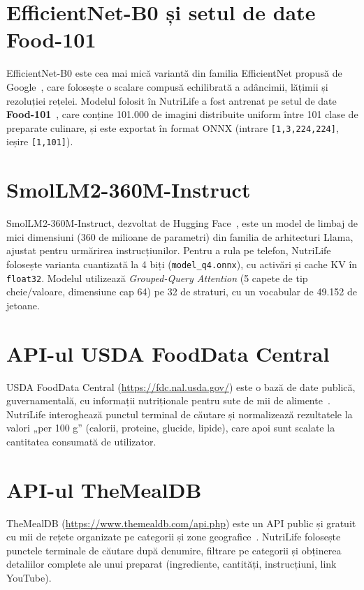 \documentclass[12pt, a4paper, twoside]{report}
\numberwithin{equation}{section}
\begin{document}
\section{EfficientNet-B0 și setul de date Food-101}

EfficientNet-B0 este cea mai mică variantă din familia EfficientNet propusă de Google~\cite{efficientnet}, care
folosește o scalare compusă echilibrată a adâncimii, lățimii și rezoluției rețelei.
Modelul folosit în NutriLife a fost antrenat pe setul de date \textbf{Food-101}~\cite{food101}, care conține
101.000 de imagini distribuite uniform între 101 clase de preparate culinare, și este
exportat în format ONNX (intrare \texttt{[1,3,224,224]}, ieșire \texttt{[1,101]}).

\section{SmolLM2-360M-Instruct}

SmolLM2-360M-Instruct, dezvoltat de Hugging Face~\cite{smollm2}, este un model de limbaj de mici dimensiuni
(360 de milioane de parametri) din familia de arhitecturi Llama, ajustat pentru urmărirea
instrucțiunilor. Pentru a rula pe telefon, NutriLife folosește varianta cuantizată la 4 biți
(\texttt{model\_q4.onnx}), cu activări și cache KV în \texttt{float32}. Modelul utilizează
\textit{Grouped-Query Attention} (5 capete de tip cheie/valoare, dimensiune cap 64) pe 32 de
straturi, cu un vocabular de 49.152 de jetoane.

\section{API-ul USDA FoodData Central}

USDA FoodData Central (\url{https://fdc.nal.usda.gov/}) este o bază de date publică,
guvernamentală, cu informații nutriționale pentru sute de mii de alimente~\cite{usda}. NutriLife
interoghează punctul terminal de căutare și normalizează rezultatele la valori „per 100 g''
(calorii, proteine, glucide, lipide), care apoi sunt scalate la cantitatea consumată de
utilizator.

\section{API-ul TheMealDB}

TheMealDB (\url{https://www.themealdb.com/api.php}) este un API public și gratuit cu mii de
rețete organizate pe categorii și zone geografice~\cite{themealdb}. NutriLife folosește punctele terminale de
căutare după denumire, filtrare pe categorii și obținerea detaliilor complete ale unui
preparat (ingrediente, cantități, instrucțiuni, link YouTube).
\end{document}
